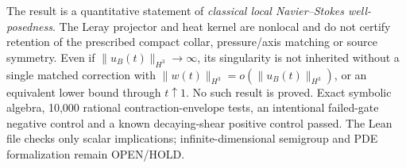 The result is a quantitative statement of \emph{classical local
Navier--Stokes well-posedness}. The Leray projector and heat kernel
are nonlocal and do not certify retention of the prescribed compact
collar, pressure/axis matching or source symmetry. Even if
$\|u_B(t)\|_{H^3}\to\infty$, its singularity is not inherited without
a single matched correction with
$\|w(t)\|_{H^3}=o(\|u_B(t)\|_{H^3})$, or an equivalent
lower bound through $t\uparrow1$. No such result is proved.
Exact symbolic algebra, 10,000 rational contraction-envelope
tests, an intentional failed-gate negative control and a
known decaying-shear positive control passed. The Lean file
checks only scalar implications; infinite-dimensional semigroup
and PDE formalization remain OPEN/HOLD.